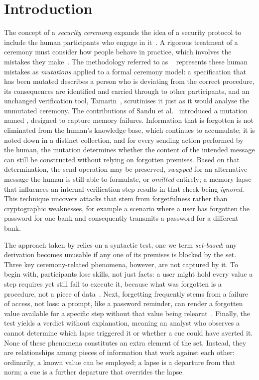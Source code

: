 \section{Introduction}
\label{sec:intro}

The concept of a \emph{security ceremony} expands the idea of a security protocol to include the human participants who engage in it~\cite{ellison2007ceremony}. A rigorous treatment of a ceremony must consider how people behave in practice, which involves the mistakes they make~\cite{bella2012layered,basin2016modeling,bella2022modelling,fila2024nothing}. The methodology referred to as \XMen{}~\cite{sempreboni2020x,sempreboni2023mutation} represents these human mistakes as \emph{mutations} applied to a formal ceremony model: a specification that has been mutated describes a person who is deviating from the correct procedure, its consequences are identified and carried through to other participants, and an unchanged verification tool, Tamarin~\cite{meier2013tamarin,basin2025modeling}, scrutinises it just as it would analyse the unmutated ceremony. The contributions of Sandu et al.~\SCP{} introduced a mutation named \forget{}, designed to capture memory failures. Information that is forgotten is not eliminated from the human's knowledge base, which continues to accumulate; it is noted down in a distinct \Forget{} collection, and for every sending action performed by the human, the mutation determines whether the content of the intended message can still be constructed without relying on forgotten premises. Based on that determination, the send operation may be preserved, \emph{swapped} for an alternative message the human is still able to formulate, or \emph{omitted} entirely; a memory lapse that influences an internal verification step results in that check being \emph{ignored}. This technique uncovers attacks that stem from forgetfulness rather than cryptographic weaknesses, for example a scenario where a user has forgotten the password for one bank and consequently transmits a password for a different bank.

The approach taken by \Forget{} relies on a syntactic test, one we term \emph{set-based}: any derivation becomes unusable if any one of its premises is blocked by the \Forget{} set. Three key ceremony-related phenomena, however, are not captured by it. To begin with, participants lose skills, not just facts: a user might hold every value a step requires yet still fail to execute it, because what was forgotten is a procedure, not a piece of data~\cite{ryle1949concept,cohen1980preserved}. Next, forgetting frequently stems from a failure of access, not loss: a prompt, like a password reminder, can render a forgotten value available for a specific step without that value being relearnt~\cite{tulving1974cue,tulving1973encoding}. Finally, the test yields a verdict without explanation, meaning an analyst who observes a \replace{} cannot determine which lapse triggered it or whether a cue could have averted it. None of these phenomena constitutes an extra element of the \Forget{} set. Instead, they are relationships among pieces of information that work against each other: ordinarily, a known value can be employed; a lapse is a departure from that norm; a cue is a further departure that overrides the lapse.

